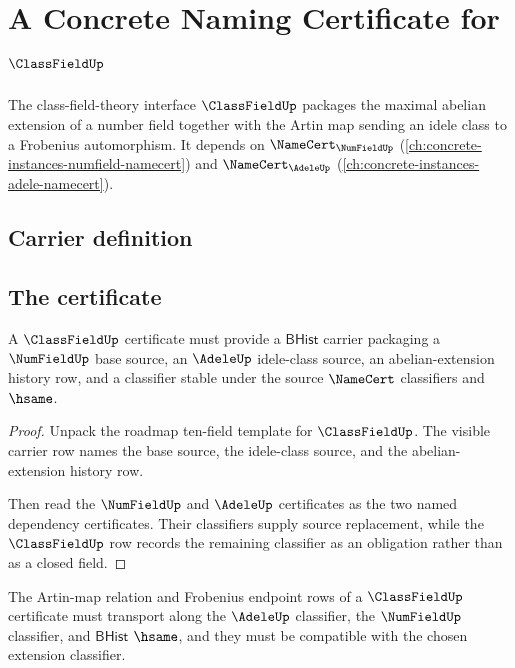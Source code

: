 \chapter{A Concrete Naming Certificate for $\ClassFieldUp$}
\label{ch:concrete-instances-classfield-namecert}

The class-field-theory interface $\ClassFieldUp$ packages the maximal abelian extension of a number field together with the Artin map sending an idele class to a Frobenius automorphism. It depends on $\NameCert_{\NumFieldUp}$ (\autoref{ch:concrete-instances-numfield-namecert}) and $\NameCert_{\AdeleUp}$ (\autoref{ch:concrete-instances-adele-namecert}).

\section{Carrier definition}
\label{sec:classfield-carrier}

\section{The certificate}
\label{sec:classfield-certificate}

\begin{theorem}\label{thm:classfield-obligation-carrier-classifier}
A $\ClassFieldUp$ certificate must provide a $\mathsf{BHist}$ carrier packaging a $\NumFieldUp$ base source, an $\AdeleUp$ idele-class source, an abelian-extension history row, and a classifier stable under the source $\NameCert$ classifiers and $\hsame$.
\end{theorem}

\begin{proof}
Unpack the roadmap ten-field template for $\ClassFieldUp$. The visible carrier row names the base source, the idele-class source, and the abelian-extension history row.

Then read the $\NumFieldUp$ and $\AdeleUp$ certificates as the two named dependency certificates. Their classifiers supply source replacement, while the $\ClassFieldUp$ row records the remaining classifier as an obligation rather than as a closed field.
\end{proof}

\begin{theorem}\label{thm:classfield-obligation-artin-frobenius-stability}
The Artin-map relation and Frobenius endpoint rows of a $\ClassFieldUp$ certificate must transport along the $\AdeleUp$ classifier, the $\NumFieldUp$ classifier, and $\mathsf{BHist}$ $\hsame$, and they must be compatible with the chosen extension classifier.
\end{theorem}

